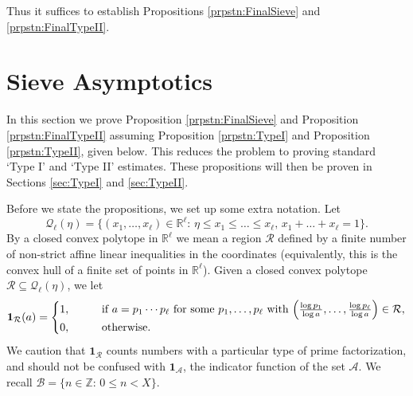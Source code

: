 \documentclass[10pt]{amsart}
\theoremstyle{plain}
\numberwithin{sblmm}{thrm}
\numberwithin{equation}{section}
\begin{document}
Thus it suffices to establish Propositions \ref{prpstn:FinalSieve} and \ref{prpstn:FinalTypeII}.
%
%
%
%
%
%
%
%
%
\section{Sieve Asymptotics} \label{sec:Sieve}
%
%
%
In this section we prove Proposition \ref{prpstn:FinalSieve} and Proposition \ref{prpstn:FinalTypeII} assuming Proposition \ref{prpstn:TypeI} and Proposition \ref{prpstn:TypeII}, given below. This reduces the problem to proving standard `Type I' and `Type II' estimates. These propositions will then be proven in Sections \ref{sec:TypeI} and \ref{sec:TypeII}.

Before we state the propositions, we set up some extra notation. Let
\[
\mathcal{Q}_\ell(\eta)=\{(x_1,\dots,x_\ell)\in\mathbb{R}^\ell:\,\eta\le x_1\le \dots \le x_\ell,\,x_1+\dots+x_\ell=1\}.
\]
By a closed convex polytope in $\mathbb{R}^\ell$ we mean a region $\mathcal{R}$ defined by a finite number of non-strict affine linear inequalities in the coordinates (equivalently, this is the convex hull of a finite set of points in $\mathbb{R}^\ell$). Given a closed convex polytope $\mathcal{R}\subseteq \mathcal{Q}_\ell(\eta)$, we let
\[
\mathbf{1}_{\mathcal{R}}(a)=
\begin{cases}
1,\qquad &\text{if }a=p_1\cdots p_{\ell}\text{ for some $p_1,\dots,p_\ell$ with }\Bigl(\frac{\log{p_1}}{\log{a}},\dots,\frac{\log{p_\ell}}{\log{a}}\Bigr)\in\mathcal{R},\\
0,&\text{otherwise.}
\end{cases}
\]
We caution that $\mathbf{1}_{\mathcal{R}}$ counts numbers with a particular type of prime factorization, and should not be confused with $\mathbf{1}_{\mathcal{A}}$, the indicator function of the set $\mathcal{A}$. We recall $\mathcal{B}=\{n\in\mathbb{Z}:\, 0\le n< X\}$.
\end{document}
